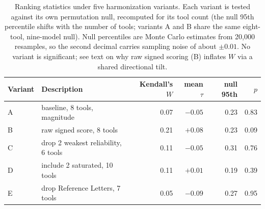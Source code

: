 \documentclass[11pt]{article}
\begin{document}
\begin{table}[htbp]\centering\small
\caption{Ranking statistics under five harmonization variants. Each variant is tested against its own permutation null, recomputed for its tool count (the null 95th percentile shifts with the number of tools; variants A and B share the same eight-tool, nine-model null). Null percentiles are Monte Carlo estimates from 20{,}000 resamples, so the second decimal carries sampling noise of about $\pm0.01$. No variant is significant; see text on why raw signed scoring (B) inflates $W$ via a shared directional tilt.}
\label{tab:sens}
\begin{tabular}{llrrrr}
\toprule
Variant & Description & Kendall's $W$ & mean $\tau$ & null 95th & $p$ \\
\midrule
A & baseline, 8 tools, magnitude & 0.07 & $-0.05$ & 0.23 & 0.83 \\
B & raw signed score, 8 tools & 0.21 & $+0.08$ & 0.23 & 0.09 \\
C & drop 2 weakest reliability, 6 tools & 0.11 & $-0.05$ & 0.31 & 0.76 \\
D & include 2 saturated, 10 tools & 0.11 & $+0.01$ & 0.19 & 0.39 \\
E & drop Reference Letters, 7 tools & 0.05 & $-0.09$ & 0.27 & 0.95 \\
\bottomrule
\end{tabular}
\end{table}



\end{document}

